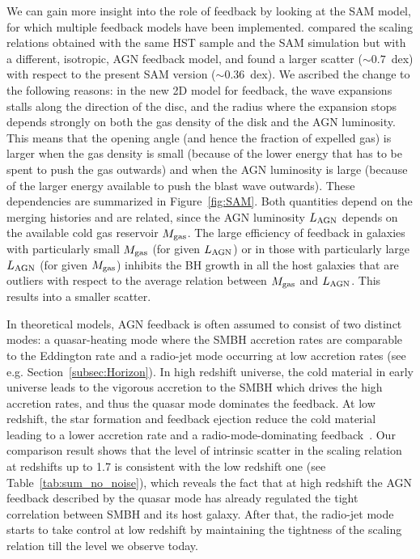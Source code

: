 \documentclass[twocolumn]{aastex631}
\begin{document}
We can gain more insight into the role of feedback by looking at the SAM model, for which multiple feedback models have been implemented. \citet{Ding2020b} compared the scaling relations obtained with the same HST sample and the SAM simulation but with a different, isotropic, AGN feedback model, and found a larger scatter ($\sim0.7$~dex) with respect to the present SAM version ($\sim0.36$~dex). We ascribed the change to the following reasons: in the new 2D model for feedback, the wave expansions stalls along the direction of the disc, and the radius where the expansion stops depends strongly on both the gas density of the disk and the AGN luminosity. 
This means that the opening angle (and hence the fraction of expelled gas) is larger when the gas density is small (because of the lower energy that has to be spent to push the gas outwards) and when the AGN luminosity is large (because of the larger energy available to push the blast wave outwards). These dependencies are summarized in Figure~\ref{fig:SAM}. 
Both quantities depend on the merging histories and are  related, since the AGN luminosity $L_{\rm AGN}$ depends on the available cold gas reservoir $M_{\rm gas}$.
The large efficiency of feedback in galaxies with particularly small $M_{\rm gas}$ (for given $L_{\rm AGN}$) or in those with particularly large $L_{\rm AGN}$
(for given $M_{\rm gas}$) inhibits the BH growth in all the host galaxies that are outliers with respect to the average relation between $M_{\rm gas}$ and $L_{\rm AGN}$. 
This results into a smaller scatter.

In theoretical models, AGN feedback is often assumed to consist of two distinct modes:
a quasar-heating mode where the SMBH accretion rates are comparable to the Eddington rate and a radio-jet mode occurring at low accretion rates (see e.g. Section~\ref{subsec:Horizon}). In high redshift universe, the cold material in early universe leads to the vigorous accretion to the SMBH which drives the high accretion rates, and thus the quasar mode dominates the feedback. At low redshift, the star formation and feedback ejection reduce the cold material leading to a lower accretion rate and a radio-mode-dominating feedback~\citep[e.g.][]{2012MNRAS.420.2662D,2016MNRAS.460.2979V,2018MNRAS.479.4056W}. Our comparison result shows that the level of intrinsic scatter in the scaling relation at redshifts up to 1.7 is consistent with the low redshift one (see Table~\ref{tab:sum_no_noise}), which reveals the fact that at high redshift the AGN feedback described by the quasar mode has already regulated the tight correlation between SMBH and its host galaxy. After that, the radio-jet mode starts to take control at low redshift by maintaining the tightness of the scaling relation till the level we observe today.
\end{document}

